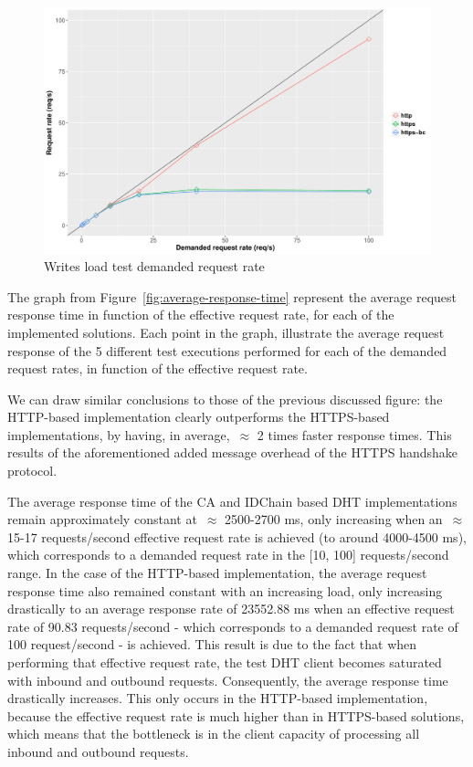 \begin{figure}[h!]
  \centering
  \includegraphics[scale=0.4]{Figures/evaluation/request-rate-writes-linear.pdf}
  \caption{Writes load test demanded request rate}
\label{fig:demanded-request-rate}
\end{figure}


The graph from Figure~\ref{fig:average-response-time} represent the average request response time in function of the effective request rate, for each of the implemented solutions.
Each point in the graph, illustrate the average request response of the 5 different test executions performed for each of the demanded request rates, in function of the effective request rate.

We can draw similar conclusions to those of the previous discussed figure: the HTTP-based implementation clearly outperforms the HTTPS-based implementations, by having, in average,~$\approx$ 2 times faster response times.
This results of the aforementioned added message overhead of the HTTPS handshake protocol.

The average response time of the CA and IDChain based DHT implementations remain approximately constant at~$\approx$ 2500-2700 ms, only increasing when an~$\approx$ 15-17 requests/second effective request rate is achieved (to around 4000-4500 ms), which corresponds to a demanded request rate in the [10, 100] requests/second range.
In the case of the HTTP-based implementation, the average request response time also remained constant with an increasing load, only increasing drastically to an average response rate of 23552.88 ms when an effective request rate of 90.83 requests/second - which corresponds to a demanded request rate of 100 request/second - is achieved.
This result is due to the fact that when performing that effective request rate, the test DHT client becomes saturated with inbound and outbound requests. Consequently, the average response time drastically increases.
This only occurs in the HTTP-based implementation, because the effective request rate is much higher than in HTTPS-based solutions, which means that the bottleneck is in the client capacity of processing all inbound and outbound requests.

